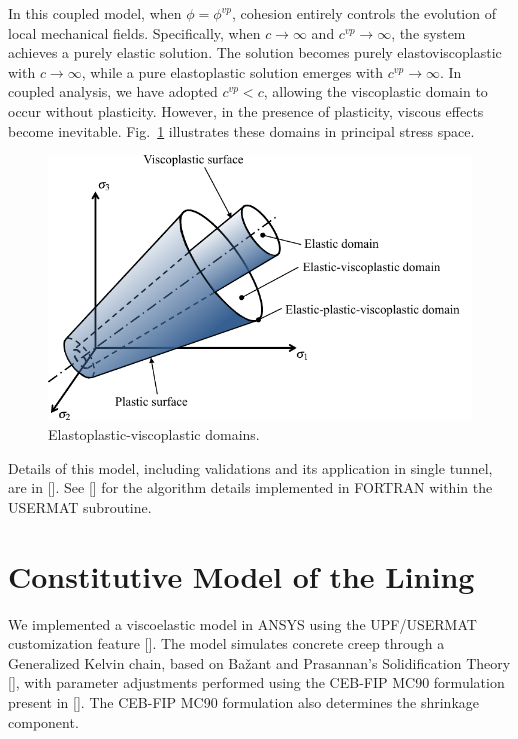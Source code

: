 \documentclass[a4paper,fleqn]{cas-sc}
\begin{document}
In this coupled model, when $\phi=\phi^{vp}$, cohesion entirely controls the evolution of local mechanical fields. Specifically, when  $c \rightarrow \infty$ and $c^{vp} \rightarrow \infty$, the system achieves a purely elastic solution. The solution becomes purely elastoviscoplastic with $c \rightarrow \infty$, while a pure elastoplastic solution emerges with $c^{vp} \rightarrow \infty$. In coupled analysis, we have adopted $c^{vp} < c$, allowing the viscoplastic domain to occur without plasticity. However, in the presence of plasticity, viscous effects become inevitable. Fig.~\ref{epvpdomains} illustrates these domains in principal stress space.
\begin{figure}[h!]
	\centering
	\includegraphics[scale=0.8]{Elastic-plastic-viscoplastic domains.pdf}
	\caption{Elastoplastic-viscoplastic domains.}
	\label{epvpdomains}
\end{figure}

Details of this model, including validations and its application in single tunnel, are in []. See [] for the algorithm details implemented in FORTRAN within the USERMAT subroutine.

\section{Constitutive Model of the Lining}\label{}

We implemented a viscoelastic model in ANSYS using the UPF/USERMAT customization feature []. The model simulates concrete creep through a Generalized Kelvin chain, based on Bažant and Prasannan's Solidification Theory [], with parameter adjustments performed using the CEB-FIP MC90 formulation present in []. The CEB-FIP MC90 formulation also determines the shrinkage component. 
\end{document}
